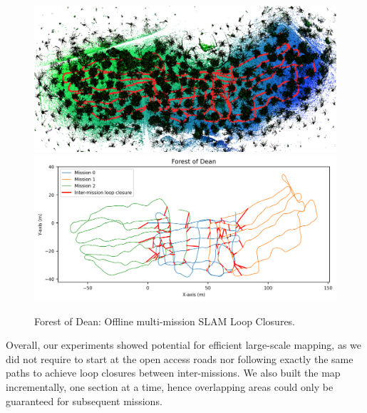 \begin{figure}[htbp]
  \ContinuedFloat
  \centering
  \includegraphics[width=\columnwidth]{pics/exp_3_offline_Dean_pcd3.png}
  \includegraphics[width=\columnwidth]{pics/exp_3_1_multimission_slam_dean.png}
  \caption{Forest of Dean: Offline multi-mission SLAM Loop Closures.}
  \label{fig:exp_multi_mission_dean}
\end{figure}


Overall, our experiments showed potential for efficient large-scale mapping, as we did not require to start at the open access roads nor following exactly the same paths to achieve loop closures between inter-missions. We also built the map incrementally, one section at a time, hence overlapping areas could only be guaranteed for subsequent missions.


